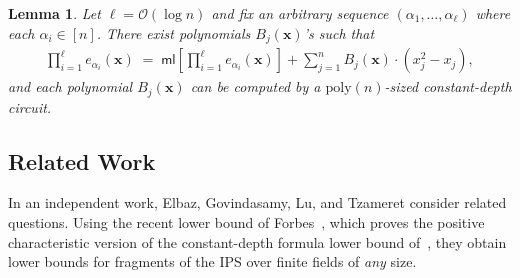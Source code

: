 \documentclass[11pt]{article}
\newtheorem{lemma}[theorem]{Lemma}
\newtheorem{definition}[theorem]{Definition}
\newcommand{\Boo}{\{0,1 \}}
\newcommand{\bigO}{\mathcal{O}}
\newcommand{\brac}[1]{\left[ #1 \right]}
\newcommand{\F}{\mathbb{F}}
\newcommand{\comment}[2]{\marginpar{\tiny{\textbf{#1: }\textit{#2}}}}
\newcommand{\anote}[1]{\comment{AB}{#1}}
\newcommand{\ssr}[1]{\comment{SS}{#1}}
\newcommand{\IPS}{\mathrm{IPS}}
\newcommand{\ml}{\mathsf{ml}}
\begin{document}
\begin{lemma}
Let $\ell = \bigO(\log n)$ and fix an arbitrary sequence $(\alpha_{1},\ldots,\alpha_{\ell})$ where each $\alpha_{i} \in [n]$. There exist polynomials $B_{j}(\mathbf{x})$'s such that
\begin{align*}
    \prod_{i = 1}^{\ell} e_{\alpha_{i}}(\mathbf{x}) \; = \; \ml\brac{\prod_{i = 1}^{\ell} e_{\alpha_{i}}(\mathbf{x})} + \sum_{j=1}^{n} B_{j}(\mathbf{x}) \cdot (x_{j}^{2} - x_{j}),
\end{align*}
and each polynomial $B_{j}(\mathbf{x})$ can be computed by a $\mathrm{poly}(n)$-sized constant-depth circuit. 
\end{lemma}


\subsection{Related Work}
\label{sec:related}
In an independent work, Elbaz, Govindasamy, Lu, and Tzameret \cite{EGLT-25} consider related questions. Using the recent lower bound of Forbes~\cite{Forbes-LST-CCC}, which proves the positive characteristic version of the constant-depth formula lower bound of~\cite{LST}, they obtain lower bounds for fragments of the IPS over finite fields of \emph{any} size.











\end{document}
